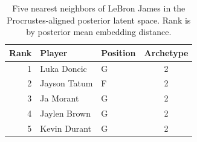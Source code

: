 \begin{table}[htbp]
  \centering\small
  \begin{tabular}{rllc}
    \toprule
    Rank & Player & Position & Archetype \\
    \midrule
    1 & Luka Doncic & G & 2 \\
    2 & Jayson Tatum & F & 2 \\
    3 & Ja Morant & G & 2 \\
    4 & Jaylen Brown & G & 2 \\
    5 & Kevin Durant & G & 2 \\
    \bottomrule
  \end{tabular}
  \caption{Five nearest neighbors of LeBron James in the Procrustes-aligned posterior latent space. Rank is by posterior mean embedding distance.}
  \label{tab:LeBron_James_neighbors}
\end{table}

